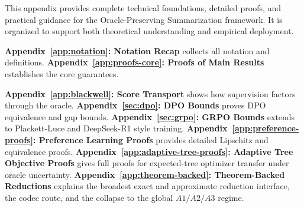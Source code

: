 



\maketitle



















\appendix

\noindent This appendix provides complete technical foundations, detailed proofs, and practical guidance for the Oracle-Preserving Summarization framework. It is organized to support both theoretical understanding and empirical deployment.

\medskip

\noindent\textbf{Appendix~\ref{app:notation}: Notation Recap} collects all notation and definitions.
\noindent\textbf{Appendix~\ref{app:proofs-core}: Proofs of Main Results} establishes the core guarantees.

\noindent\textbf{Appendix~\ref{app:blackwell}: Score Transport} shows how supervision factors through the oracle.
\noindent\textbf{Appendix~\ref{sec:dpo}: DPO Bounds} proves DPO equivalence and gap bounds.
\noindent\textbf{Appendix~\ref{sec:grpo}: GRPO Bounds} extends to Plackett-Luce and DeepSeek-R1 style training.
\noindent\textbf{Appendix~\ref{app:preference-proofs}: Preference Learning Proofs} provides detailed Lipschitz and equivalence proofs.
\noindent\textbf{Appendix~\ref{app:adaptive-tree-proofs}: Adaptive Tree Objective Proofs} gives full proofs for expected-tree optimizer transfer under oracle uncertainty.
\noindent\textbf{Appendix~\ref{app:theorem-backed}: Theorem-Backed Reductions} explains the broadest exact and approximate reduction interface, the codec route, and the collapse to the global $A1/A2/A3$ regime.

